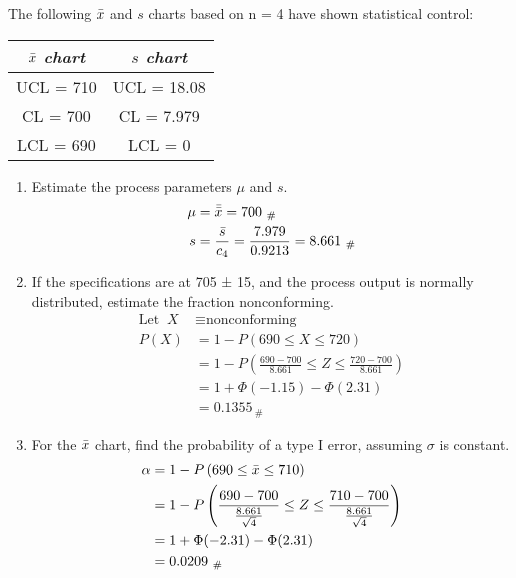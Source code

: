 The following $\Bar{x}$ and $s$ charts based on n = 4 have shown statistical control:

\begin{table}[h]
    \centering
    \begin{tabular}{c|c}
    \textit{$\Bar{x}$ chart} & \textit{$s$ chart} \\ \hline
    UCL = 710        & UCL = 18.08      \\
    CL = 700         & CL = 7.979       \\
    LCL = 690        & LCL = 0         
    \end{tabular}
\end{table}

\begin{enumerate}
    \item Estimate the process parameters $\mu$ and $s$.
        \begin{align*}
            \mu &= \Bar{\Bar{x}} = 700_{\ \#}\\
            s &= \frac{\Bar{s}}{c_4} = \frac{7.979}{0.9213} = 8.661_{\ \#}
        \end{align*}
    
    \item If the specifications are at 705 ± 15, and the process output is normally distributed, estimate the fraction nonconforming.
        \begin{align*}
            \text{Let }\ X &\equiv \text{nonconforming}\\
            P\left(X \right) &= 1 - P\left(690 \leq X \leq 720 \right)\\
            &= 1 - P\left(\frac{690 - 700}{8.661} \leq Z \leq \frac{720 - 700}{8.661} \right)\\
            &= 1 + \Phi(-1.15) - \Phi(2.31)\\
            &= 0.1355_{\ \#}
        \end{align*}
            
    \item For the $\Bar{x}$ chart, find the probability of a type I error, assuming $\sigma$ is constant.
        \begin{align*}
            \alpha &= 1 - P\left(690 \leq \Bar{x} \leq 710 \right)\\
            &= 1 - P\left(\frac{690 - 700}{\frac{8.661}{\sqrt{4}}} \leq Z \leq \frac{710 - 700}{\frac{8.661}{\sqrt{4}}} \right)\\
            &= 1 + \Phi(-2.31) - \Phi(2.31)\\
            &= 0.0209_{\ \#}
        \end{align*}\pagebreak


\end{enumerate}
